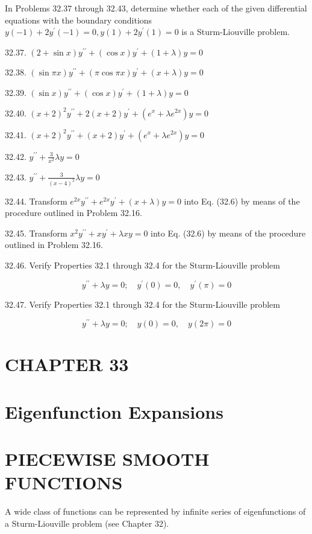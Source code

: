 \documentclass[10pt]{article}
\begin{document}
In Problems 32.37 through 32.43, determine whether each of the given differential equations with the boundary conditions $y(-1)+2 y^{\prime}(-1)=0, y(1)+2 y^{\prime}(1)=0$ is a Sturm-Liouville problem.

32.37. $(2+\sin x) y^{\prime \prime}+(\cos x) y^{\prime}+(1+\lambda) y=0$

32.38. $(\sin \pi x) y^{\prime \prime}+(\pi \cos \pi x) y^{\prime}+(x+\lambda) y=0$

32.39. $(\sin x) y^{\prime \prime}+(\cos x) y^{\prime}+(1+\lambda) y=0$

32.40. $(x+2)^{2} y^{\prime \prime}+2(x+2) y^{\prime}+\left(e^{x}+\lambda e^{2 x}\right) y=0$

32.41. $(x+2)^{2} y^{\prime \prime}+(x+2) y^{\prime}+\left(e^{x}+\lambda e^{2 x}\right) y=0$

32.42. $y^{\prime \prime}+\frac{3}{x^{2}} \lambda y=0$

32.43. $y^{\prime \prime}+\frac{3}{(x-4)^{2}} \lambda y=0$

32.44. Transform $e^{2 x} y^{\prime \prime}+e^{2 x} y^{\prime}+(x+\lambda) y=0$ into Eq. (32.6) by means of the procedure outlined in Problem 32.16.

32.45. Transform $x^{2} y^{\prime \prime}+x y^{\prime}+\lambda x y=0$ into Eq. (32.6) by means of the procedure outlined in Problem 32.16.

32.46. Verify Properties 32.1 through 32.4 for the Sturm-Liouville problem

$$
y^{\prime \prime}+\lambda y=0 ; \quad y^{\prime}(0)=0, \quad y^{\prime}(\pi)=0
$$

32.47. Verify Properties 32.1 through 32.4 for the Sturm-Liouville problem

$$
y^{\prime \prime}+\lambda y=0 ; \quad y(0)=0, \quad y(2 \pi)=0
$$

\section*{CHAPTER 33}
\section*{Eigenfunction Expansions}
\section*{PIECEWISE SMOOTH FUNCTIONS}
A wide class of functions can be represented by infinite series of eigenfunctions of a Sturm-Liouville problem (see Chapter 32).
\end{document}
